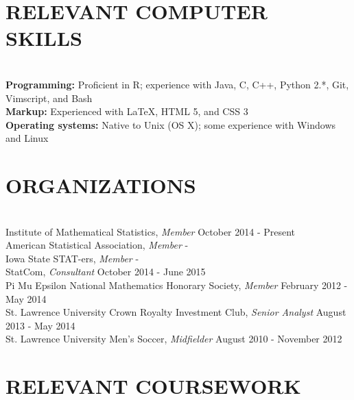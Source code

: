 \documentclass{res} %
\begin{document}
\begin{resume}

\section{RELEVANT COMPUTER SKILLS}

\hrulefill \\
{\bf Programming:} Proficient in R; experience with Java, C, C++, Python 2.*, Git,
Vimscript, and Bash \\
{\bf Markup:} Experienced with \LaTeX, HTML 5, and CSS 3 \\
{\bf Operating systems:} Native to Unix (OS X); some experience with Windows and Linux


\section{ORGANIZATIONS}

\hrulefill \\
Institute of Mathematical Statistics, {\sl Member} \dotfill October 2014 - Present \\
American Statistical Association, {\sl Member} \hfill - \\
Iowa State STAT-ers, {\sl Member} \hfill - \\
StatCom, {\sl Consultant} \dotfill October 2014 - June 2015\\
Pi Mu Epsilon National Mathematics Honorary Society, {\sl Member} \dotfill February 2012 - May 2014 \\
St. Lawrence University Crown Royalty Investment Club, {\sl Senior Analyst} \dotfill August 2013 - May 2014 \\
St. Lawrence University Men's Soccer, {\sl Midfielder} \dotfill August 2010 - November 2012 


\section{RELEVANT COURSEWORK}


\end{resume}
\end{document}
